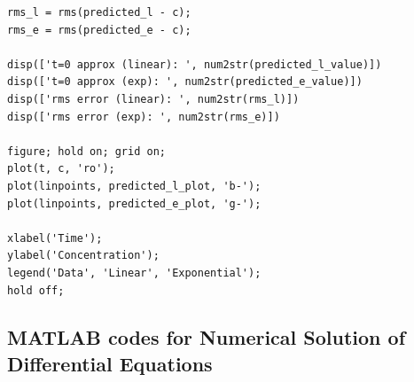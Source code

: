 \documentclass{article}
\begin{document}
\begin{lstlisting}
rms_l = rms(predicted_l - c);
rms_e = rms(predicted_e - c);

disp(['t=0 approx (linear): ', num2str(predicted_l_value)])
disp(['t=0 approx (exp): ', num2str(predicted_e_value)])
disp(['rms error (linear): ', num2str(rms_l)])
disp(['rms error (exp): ', num2str(rms_e)])

figure; hold on; grid on;
plot(t, c, 'ro');
plot(linpoints, predicted_l_plot, 'b-');
plot(linpoints, predicted_e_plot, 'g-');

xlabel('Time');
ylabel('Concentration');
legend('Data', 'Linear', 'Exponential');
hold off;

\end{lstlisting}

\bigskip

\subsection*{MATLAB codes for Numerical Solution of Differential Equations}
\end{document}
